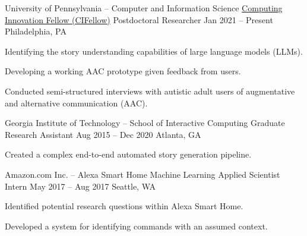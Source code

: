 {\color{black}\fontsize{12pt}{1em}} 


\begin{cventries}

  \cventry
    {University of Pennsylvania -- Computer and Information Science} %
    {\href{https://cifellows2020.org/}{Computing Innovation Fellow (CIFellow)} Postdoctoral Researcher} %
    {Jan 2021 – Present} %
    {Philadelphia, PA} %
    {
      \begin{cvitems} %
      \item {Identifying the story understanding capabilities of large language models (LLMs).}
      \item {Developing a working AAC prototype given feedback from users.}
      \item {Conducted semi-structured interviews with autistic adult users of augmentative and alternative communication (AAC).}
      \end{cvitems}
    }
  \cventry
    {Georgia Institute of Technology -- School of Interactive Computing} %
    {Graduate Research Assistant} %
    {Aug 2015 – Dec 2020} %
    {Atlanta, GA} %
    {
      \begin{cvitems} %
        \item {Created a complex end-to-end automated story generation pipeline.}
      \end{cvitems}
    }

  \cventry
    {Amazon.com Inc. -- Alexa Smart Home Machine Learning} %
    {Applied Scientist Intern} %
    {May 2017 – Aug 2017} %
    {Seattle, WA} %
    {
      \begin{cvitems} %
        \item {Identified potential research questions within Alexa Smart Home.}
        \item {Developed a system for identifying commands with an assumed context.}
      \end{cvitems}
    }


\end{cventries}
